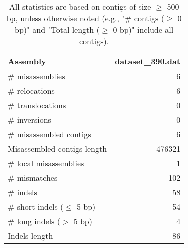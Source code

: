 \documentclass[12pt,a4paper]{article}
\begin{document}
\begin{table}[ht]
\begin{center}
\caption{All statistics are based on contigs of size $\geq$ 500 bp, unless otherwise noted (e.g., "\# contigs ($\geq$ 0 bp)" and "Total length ($\geq$ 0 bp)" include all contigs).}
\begin{tabular}{|l*{1}{|r}|}
\hline
Assembly & dataset\_390.dat \\ \hline
\# misassemblies & 6 \\ \hline
\hspace{5mm}\# relocations & 6 \\ \hline
\hspace{5mm}\# translocations & 0 \\ \hline
\hspace{5mm}\# inversions & 0 \\ \hline
\# misassembled contigs & 6 \\ \hline
Misassembled contigs length & 476321 \\ \hline
\# local misassemblies & 1 \\ \hline
\# mismatches & 102 \\ \hline
\# indels & 58 \\ \hline
\hspace{5mm}\# short indels ($\leq$ 5 bp) & 54 \\ \hline
\hspace{5mm}\# long indels ($>$ 5 bp) & 4 \\ \hline
Indels length & 86 \\ \hline
\end{tabular}
\end{center}
\end{table}
\end{document}
